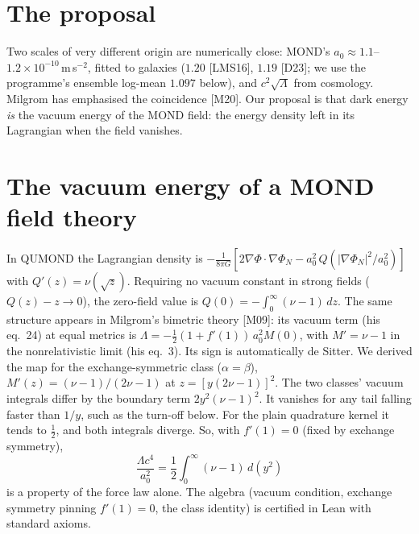 \documentclass[10pt]{article}
\begin{document}
\section{The proposal}
Two scales of very different origin are numerically close: MOND's $a_0\approx1.1$--$1.2\times10^{-10}$\,m\,s$^{-2}$, fitted to galaxies ($1.20$ [LMS16], $1.19$ [D23]; we use the programme's ensemble log-mean $1.097$ below), and $c^2\sqrt{\Lambda}$ from cosmology. Milgrom has emphasised the coincidence [M20]. Our proposal is that dark energy \emph{is} the vacuum energy of the MOND field: the energy density left in its Lagrangian when the field vanishes.

\section{The vacuum energy of a MOND field theory}
In QUMOND the Lagrangian density is $-\tfrac{1}{8\pi G}[2\nabla\Phi\!\cdot\!\nabla\Phi_N-a_0^2\,Q(|\nabla\Phi_N|^2/a_0^2)]$ with $Q'(z)=\nu(\sqrt z)$. Requiring no vacuum constant in strong fields ($Q(z)-z\to0$), the zero-field value is $Q(0)=-\int_0^\infty(\nu-1)\,dz$. The same structure appears in Milgrom's bimetric theory [M09]: its vacuum term (his eq.~24) at equal metrics is $\Lambda=-\tfrac12(1+f'(1))\,a_0^2M(0)$, with $M'=\nu-1$ in the nonrelativistic limit (his eq.~3). Its sign is automatically de Sitter. We derived the map for the exchange-symmetric class ($\alpha=\beta$), $M'(z)=(\nu-1)/(2\nu-1)$ at $z=[y(2\nu-1)]^2$. The two classes' vacuum integrals differ by the boundary term $2y^2(\nu-1)^2$. It vanishes for any tail falling faster than $1/y$, such as the turn-off below. For the plain quadrature kernel it tends to $\tfrac12$, and both integrals diverge. So, with $f'(1)=0$ (fixed by exchange symmetry),
\begin{equation}
\boxed{\;\frac{\Lambda c^4}{a_0^2}=\frac12\int_0^\infty(\nu-1)\,d(y^2)\;}
\end{equation}
is a property of the force law alone. The algebra (vacuum condition, exchange symmetry pinning $f'(1)=0$, the class identity) is certified in Lean with standard axioms.
\end{document}
